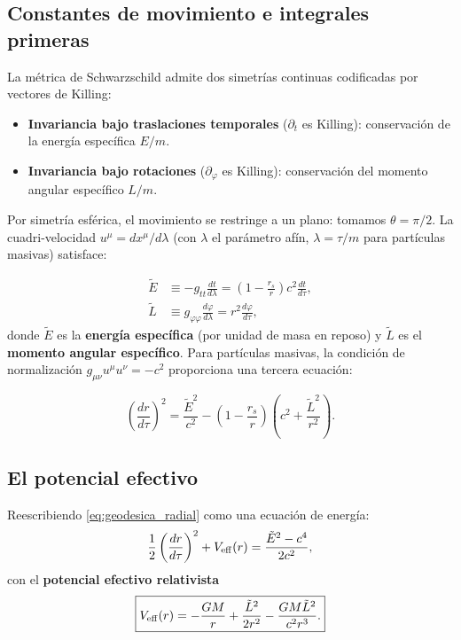 \subsection{Constantes de movimiento e integrales primeras}

La métrica de Schwarzschild admite dos simetrías continuas codificadas por vectores de Killing:
\begin{itemize}[leftmargin=2em]
  \item \textbf{Invariancia bajo traslaciones temporales} ($\partial_t$ es Killing): conservación de la energía específica $E/m$.
  \item \textbf{Invariancia bajo rotaciones} ($\partial_\varphi$ es Killing): conservación del momento angular específico $L/m$.
\end{itemize}

Por simetría esférica, el movimiento se restringe a un plano: tomamos $\theta = \pi/2$. La cuadri-velocidad $u^\mu = dx^\mu/d\lambda$ (con $\lambda$ el parámetro afín, $\lambda = \tau/m$ para partículas masivas) satisface:

\begin{align}
  \tilde{E} &\equiv -g_{tt}\frac{dt}{d\lambda} = \left(1 - \frac{r_s}{r}\right)c^2\frac{dt}{d\tau},
  \label{eq:energia_schwarz}\\
  \tilde{L} &\equiv g_{\varphi\varphi}\frac{d\varphi}{d\lambda} = r^2\frac{d\varphi}{d\tau},
  \label{eq:momento_schwarz}
\end{align}
donde $\tilde{E}$ es la \textbf{energía específica} (por unidad de masa en reposo) y $\tilde{L}$ es el \textbf{momento angular específico}. Para partículas masivas, la condición de normalización $g_{\mu\nu}u^\mu u^\nu = -c^2$ proporciona una tercera ecuación:

\begin{equation}
  \left(\frac{dr}{d\tau}\right)^2 = \frac{\tilde{E}^2}{c^2} - \left(1 - \frac{r_s}{r}\right)\!\left(c^2 + \frac{\tilde{L}^2}{r^2}\right).
  \label{eq:geodesica_radial}
\end{equation}

\subsection{El potencial efectivo}

Reescribiendo \eqref{eq:geodesica_radial} como una ecuación de energía:
\begin{equation}
  \frac{1}{2}\left(\frac{dr}{d\tau}\right)^2 + V_{\rm eff}(r) = \frac{\tilde{E}^2 - c^4}{2c^2},
  \label{eq:energia_efec}
\end{equation}
con el \textbf{potencial efectivo relativista}
\begin{equation}
  \boxed{V_{\rm eff}(r) = -\frac{GM}{r} + \frac{\tilde{L}^2}{2r^2} - \frac{GM\tilde{L}^2}{c^2 r^3}.}
  \label{eq:pot_efec}
\end{equation}

